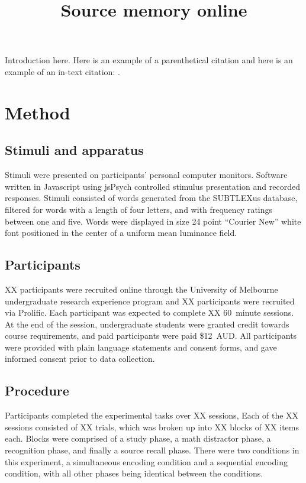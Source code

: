 \documentclass[10pt, a4paper, man, biblatex]{apa6}
\title{Source memory online}
\begin{document}
\maketitle %

Introduction here. Here is an example of a parenthetical citation
\parencite{Harlow2013} and here is an example of an in-text citation:
\textcite{Smith2016}.

\section{Method}
\subsection{Stimuli and apparatus}
Stimuli were presented on participants' personal computer monitors. Software written in Javascript using jsPsych \parencite{deLeeuw2015} controlled stimulus presentation and recorded responses. Stimuli consisted of words generated from the SUBTLEXus database, filtered for words with a length of four letters, and with frequency ratings between one and five. Words were displayed in size 24 point ``Courier New'' white font positioned in the center of a uniform mean luminance field. 

\subsection{Participants}
XX participants were recruited online through the University of Melbourne undergraduate research experience program and XX participants were recruited via Prolific. Each participant was expected to complete XX 60~minute sessions. At the end of the session, undergraduate students were granted credit towards course requirements, and paid participants were paid \$12~AUD. All participants were provided with plain language statements and consent forms, and gave informed consent prior to data collection.

\subsection{Procedure}
Participants completed the experimental tasks over XX sessions, Each of the XX sessions consisted of XX trials, which was broken up into XX blocks of XX items each. Blocks were comprised of a study phase, a math distractor phase, a recognition phase, and finally a source recall phase. There were two conditions in this experiment, a simultaneous encoding condition and a sequential encoding condition, with all other phases being identical between the conditions. 
\end{document}
